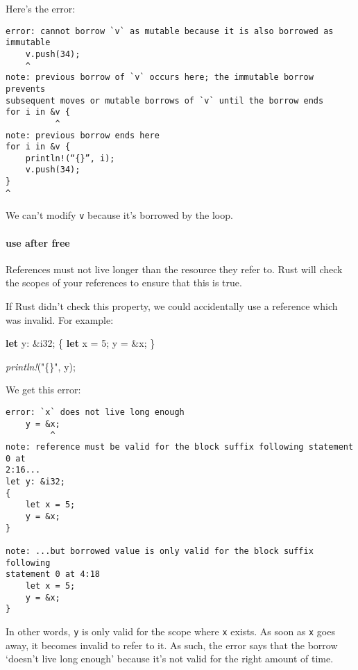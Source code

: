 \documentclass[a4paper,]{book}
\newenvironment{Shaded}{\begin{snugshade}}{\end{snugshade}}
\newcommand{\KeywordTok}[1]{\textcolor[rgb]{0.13,0.29,0.53}{\textbf{{#1}}}}
\newcommand{\DataTypeTok}[1]{\textcolor[rgb]{0.13,0.29,0.53}{{#1}}}
\newcommand{\DecValTok}[1]{\textcolor[rgb]{0.00,0.00,0.81}{{#1}}}
\newcommand{\StringTok}[1]{\textcolor[rgb]{0.31,0.60,0.02}{{#1}}}
\newcommand{\PreprocessorTok}[1]{\textcolor[rgb]{0.56,0.35,0.01}{\textit{{#1}}}}
\newcommand{\NormalTok}[1]{{#1}}
\let\oldparagraph\paragraph
\renewcommand{\paragraph}[1]{\oldparagraph{#1}\mbox{}}
\begin{document}
Here's the error:

\begin{verbatim}
error: cannot borrow `v` as mutable because it is also borrowed as immutable
    v.push(34);
    ^
note: previous borrow of `v` occurs here; the immutable borrow prevents
subsequent moves or mutable borrows of `v` until the borrow ends
for i in &v {
          ^
note: previous borrow ends here
for i in &v {
    println!(“{}”, i);
    v.push(34);
}
^
\end{verbatim}

We can't modify \texttt{v} because it's borrowed by the loop.

\paragraph{use after free}\label{use-after-free}

References must not live longer than the resource they refer to. Rust
will check the scopes of your references to ensure that this is true.

If Rust didn't check this property, we could accidentally use a
reference which was invalid. For example:

\begin{Shaded}
\begin{Highlighting}[]
\KeywordTok{let} \NormalTok{y: &}\DataTypeTok{i32}\NormalTok{;}
\NormalTok{\{}
    \KeywordTok{let} \NormalTok{x = }\DecValTok{5}\NormalTok{;}
    \NormalTok{y = &x;}
\NormalTok{\}}

\PreprocessorTok{println!}\NormalTok{(}\StringTok{"\{\}"}\NormalTok{, y);}
\end{Highlighting}
\end{Shaded}

We get this error:

\begin{verbatim}
error: `x` does not live long enough
    y = &x;
         ^
note: reference must be valid for the block suffix following statement 0 at
2:16...
let y: &i32;
{
    let x = 5;
    y = &x;
}

note: ...but borrowed value is only valid for the block suffix following
statement 0 at 4:18
    let x = 5;
    y = &x;
}
\end{verbatim}

In other words, \texttt{y} is only valid for the scope where \texttt{x}
exists. As soon as \texttt{x} goes away, it becomes invalid to refer to
it. As such, the error says that the borrow `doesn't live long enough'
because it's not valid for the right amount of time.
\end{document}
